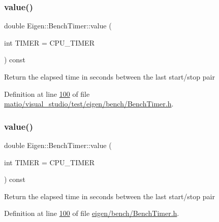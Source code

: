 \subsubsection{\texorpdfstring{value()}{value()}\hspace{0.1cm}{\footnotesize\ttfamily [1/2]}}
{\footnotesize\ttfamily double Eigen\+::\+Bench\+Timer\+::value (\begin{DoxyParamCaption}\item[{int}]{T\+I\+M\+ER = {\ttfamily CPU\+\_\+TIMER} }\end{DoxyParamCaption}) const\hspace{0.3cm}{\ttfamily [inline]}}

Return the elapsed time in seconds between the last start/stop pair 

Definition at line \hyperlink{matio_2visual__studio_2test_2eigen_2bench_2_bench_timer_8h_source_l00100}{100} of file \hyperlink{matio_2visual__studio_2test_2eigen_2bench_2_bench_timer_8h_source}{matio/visual\+\_\+studio/test/eigen/bench/\+Bench\+Timer.\+h}.

\mbox{\label{class_eigen_1_1_bench_timer_a26760f963ed8b64c126159bfea57735e}} 
\subsubsection{\texorpdfstring{value()}{value()}\hspace{0.1cm}{\footnotesize\ttfamily [2/2]}}
{\footnotesize\ttfamily double Eigen\+::\+Bench\+Timer\+::value (\begin{DoxyParamCaption}\item[{int}]{T\+I\+M\+ER = {\ttfamily CPU\+\_\+TIMER} }\end{DoxyParamCaption}) const\hspace{0.3cm}{\ttfamily [inline]}}

Return the elapsed time in seconds between the last start/stop pair 

Definition at line \hyperlink{eigen_2bench_2_bench_timer_8h_source_l00100}{100} of file \hyperlink{eigen_2bench_2_bench_timer_8h_source}{eigen/bench/\+Bench\+Timer.\+h}.

\mbox{\label{class_eigen_1_1_bench_timer_ab912bf8bcae22898c85d907f0810173e}} 
